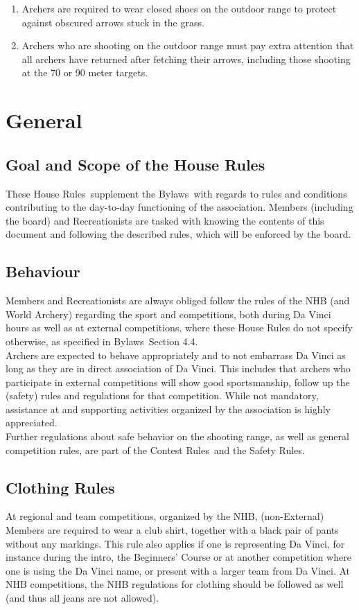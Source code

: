 \documentclass[a4paper]{article}
\newcommand{\Asta}{Bylaws} %
\newcommand{\Ahr}{House Rules} %
\newcommand{\Asr}{Safety Rules} %
\newcommand{\Awr}{Contest Rules} %
\begin{document}
\begin{enumerate}
  \item Archers are required to wear closed shoes on the outdoor range to protect against obscured arrows stuck in the grass.
  \item Archers who are shooting on the outdoor range must pay extra attention that all archers have returned after fetching their arrows, including those shooting at the 70 or 90 meter targets.
\end{enumerate}

\section{General}
\subsection{Goal and Scope of the \Ahr}
These \Ahr\ supplement the \Asta\ with regards to rules and conditions contributing to the day-to-day functioning of the association. Members (including the board) and Recreationists are tasked with knowing the contents of this document and following the described rules, which will be enforced by the board. \\

\subsection{Behaviour}
Members and Recreationists are always obliged follow the rules of the NHB (and World Archery) regarding the sport and competitions, both during Da Vinci hours as well as at external competitions, where these House Rules do not specify otherwise, as specified in \Asta\ Section 4.4. \\

Archers are expected to behave appropriately and to not embarrass Da Vinci as long as they are in direct association of Da Vinci. This includes that archers who participate in external competitions will show good sportsmanship, follow up the (safety) rules and regulations for that competition. While not mandatory, assistance at and supporting activities organized by the association is highly appreciated. \\

Further regulations about safe behavior on the shooting range, as well as general competition rules, are part of the \Awr\ and the \Asr .

\subsection{Clothing Rules}
\label{section:clubclothing}
At regional and team competitions, organized by the NHB, (non-External) Members are required to wear a club shirt, together with a black pair of pants without any markings. This rule also applies if one is representing Da Vinci, for instance during the intro, the Beginners' Course or at another competition where one is using the Da Vinci name, or present with a larger team from Da Vinci. At NHB competitions, the NHB regulations for clothing should be followed as well (and thus all jeans are not allowed).
\end{document}
